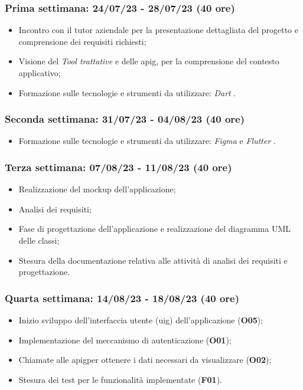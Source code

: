 \subsubsection{Prima settimana: 24/07/23 - 28/07/23 (40 ore)}
    \begin{itemize}
        \item Incontro con il tutor aziendale per la presentazione dettagliata del progetto e comprensione dei requisiti richiesti;
        \item Visione del \emph{Tool trattative} e delle \gls{apig}\glsoccur, per la comprensione del contesto applicativo;
        \item Formazione sulle tecnologie e strumenti da utilizzare: \emph{Dart} \cite{site:dart}.
    \end{itemize}
\subsubsection{Seconda settimana: 31/07/23 - 04/08/23 (40 ore)}
    \begin{itemize}
        \item Formazione sulle tecnologie e strumenti da utilizzare: \emph{Figma} \cite{site:figma} e \emph{Flutter} \cite{site:flutter}.
    \end{itemize}
\subsubsection{Terza settimana: 07/08/23 - 11/08/23 (40 ore)}
    \begin{itemize}
        \item Realizzazione del \gls{mockup} dell'applicazione;
        \item Analisi dei requisiti;
        \item Fase di progettazione dell'applicazione e realizzazione del diagramma UML delle classi;
        \item Stesura della documentazione relativa alle attività di analisi dei requisiti e progettazione.
    \end{itemize}
\subsubsection{Quarta settimana: 14/08/23 - 18/08/23 (40 ore)}
    \begin{itemize}
        \item Inizio sviluppo dell'interfaccia utente (\gls{uig}\glsoccur) dell'applicazione (\textbf{O05});
        \item Implementazione del meccanismo di autenticazione (\textbf{O01});
        \item Chiamate alle \gls{apig}\glsoccur per ottenere i dati necessari da visualizzare (\textbf{O02});
        \item Stesura dei test per le funzionalità implementate (\textbf{F01}).
    \end{itemize}
